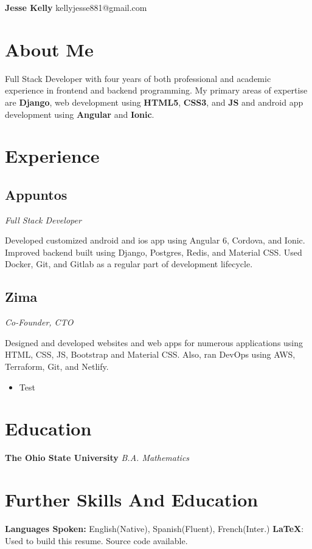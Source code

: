 \documentclass[letterpaper,11pt]{article}
\begin{document}
\begin{flushleft}
\Large{\textbf{Jesse Kelly}}
\newline
kellyjesse881@gmail.com
\end{flushleft}

\section{About Me}
Full Stack Developer with four years of both
professional and academic experience in frontend
and backend programming. My primary areas of
expertise are \textbf{Django}, web development using \textbf{HTML5},
\textbf{CSS3}, and \textbf{JS} and android app development using
\textbf{Angular} and \textbf{Ionic}.

\section{Experience}
\subsection{Appuntos}
\textit{Full Stack Developer}
\vspace{2mm}
\begin{adjustwidth}{1cm}{1cm}
Developed customized android and ios
app using Angular 6, Cordova, and Ionic.
Improved backend built using Django,
Postgres, Redis, and Material CSS. Used
Docker, Git, and Gitlab as a regular part
of development lifecycle.
\end{adjustwidth}

\subsection{Zima}
\textit{Co-Founder, CTO}
\vspace{2mm}
\begin{adjustwidth}{1cm}{1cm}
Designed and developed websites and web
apps for numerous applications using
HTML, CSS, JS, Bootstrap and Material CSS.
Also, ran DevOps using AWS, Terraform,
Git, and Netlify.
\vspace{2mm}
\begin{itemize}
\item Test
\end{itemize}
\end{adjustwidth}
\section{Education}
\textbf{The Ohio State University}
\newline
\textit{B.A. Mathematics}

\section{Further Skills And Education}
\textbf{Languages Spoken: } English(Native), Spanish(Fluent), French(Inter.)
\newline
\textbf{\LaTeX}: Used to build this resume. Source code available.
\end{document}

